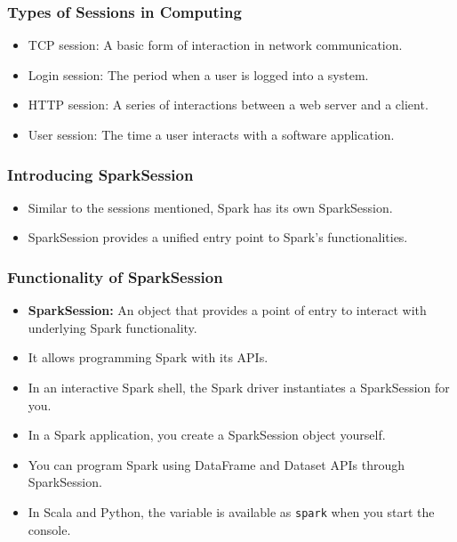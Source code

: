 \begin{frame}
    \frametitle{Types of Sessions in Computing}

    \begin{itemize}
        \item TCP session: A basic form of interaction in network communication.
        \item Login session: The period when a user is logged into a system.
        \item HTTP session: A series of interactions between a web server and a client.
        \item User session: The time a user interacts with a software application.
    \end{itemize}

\end{frame}

\begin{frame}
    \frametitle{Introducing SparkSession}

    \begin{itemize}
        \item Similar to the sessions mentioned, Spark has its own SparkSession.
        \item SparkSession provides a unified entry point to Spark's functionalities.
    \end{itemize}

\end{frame}

\begin{frame}
    \frametitle{Functionality of SparkSession}

    \begin{itemize}
        \item \textbf{SparkSession:} An object that provides a point of entry to interact with underlying Spark functionality.
        \item It allows programming Spark with its APIs.
        \item In an interactive Spark shell, the Spark driver instantiates a SparkSession for you.
        \item In a Spark application, you create a SparkSession object yourself.
        \item You can program Spark using DataFrame and Dataset APIs through SparkSession.
        \item In Scala and Python, the variable is available as \texttt{spark} when you start the console.

    \end{itemize}
\end{frame}

